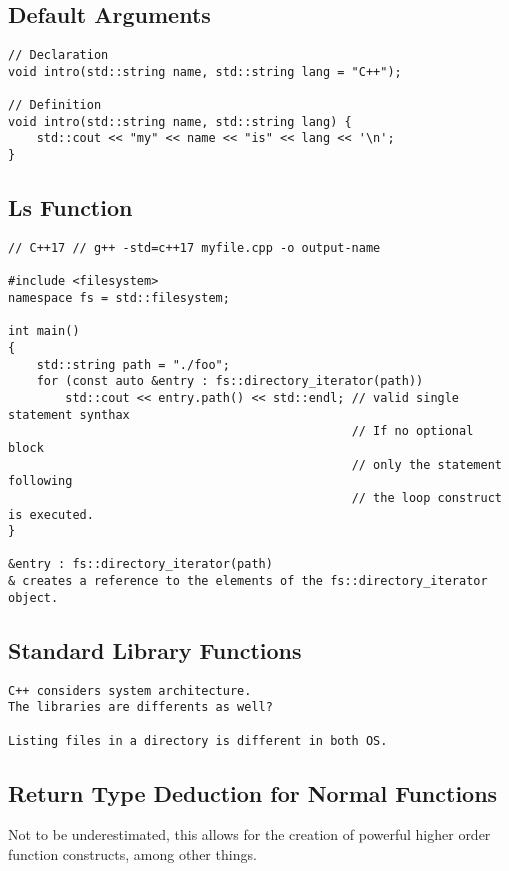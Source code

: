 \subsection{Default Arguments}

\begin{verbatim}
// Declaration
void intro(std::string name, std::string lang = "C++");

// Definition
void intro(std::string name, std::string lang) {
    std::cout << "my" << name << "is" << lang << '\n';
}
\end{verbatim}

\subsection{Ls Function}

\begin{verbatim}
// C++17 // g++ -std=c++17 myfile.cpp -o output-name

#include <filesystem>
namespace fs = std::filesystem;

int main()
{
    std::string path = "./foo";
    for (const auto &entry : fs::directory_iterator(path))
        std::cout << entry.path() << std::endl; // valid single statement synthax
                                                // If no optional block
                                                // only the statement following
                                                // the loop construct is executed.
}

&entry : fs::directory_iterator(path)
& creates a reference to the elements of the fs::directory_iterator object.

\end{verbatim}

\subsection{Standard Library Functions}
\begin{verbatim}
C++ considers system architecture. 
The libraries are differents as well?

Listing files in a directory is different in both OS.
\end{verbatim}

\subsection{Return Type Deduction for Normal Functions}

Not to be underestimated, this allows
for the creation of powerful higher order function constructs, among other things.

